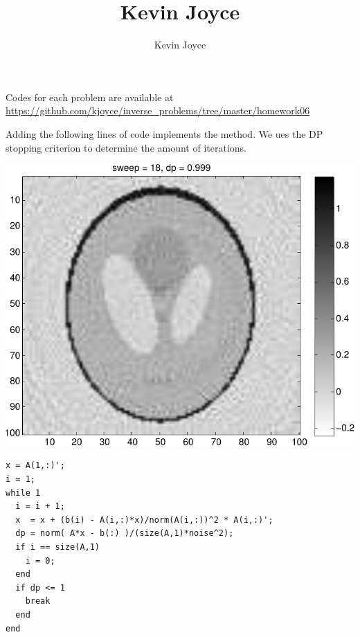 \documentclass{homework}
\title{Kevin Joyce}
\author{Kevin Joyce}
\begin{document}
 
\newcommand{\figref}[1]{\figurename~\ref{#1}}
\renewcommand{\bar}{\overline}
\renewcommand{\hat}{\widehat}
\renewcommand{\SS}{\mathcal S}
\newcommand{\HH}{\mathscr H}
\newcommand{\mom}{\widetilde}
\newcommand{\mle}{\widehat \Uptheta}
\newcommand{\eps}{\varepsilon}
\newcommand{\todist}{\stackrel{D}\longrightarrow}
\newcommand{\toprob}{\stackrel{p}\longrightarrow}
\newcommand{\TTheta}{\overline{\underline \Theta} }
\newcommand{\del}{\partial}
\newcommand{\approxsim}{\overset{\cdotp}{\underset{\cdotp}{\sim}}}

Codes for each problem are available at \url{https://github.com/kjoyce/inverse_problems/tree/master/homework06}


\begin{solution}
Adding the following lines of code implements the method.  We ues the DP stopping criterion to determine the amount of iterations.

\begin{minipage}{.4\textwidth}
\includegraphics[width=\textwidth]{tomography.pdf}
\end{minipage}
\begin{minipage}{.55\textwidth}
\begin{lstlisting}
x = A(1,:)';
i = 1;
while 1
  i = i + 1;
  x  = x + (b(i) - A(i,:)*x)/norm(A(i,:))^2 * A(i,:)';
  dp = norm( A*x - b(:) )/(size(A,1)*noise^2);
  if i == size(A,1)
    i = 0;
  end
  if dp <= 1
    break
  end
end 
\end{lstlisting}
\end{minipage}

\end{solution}
\end{document}
